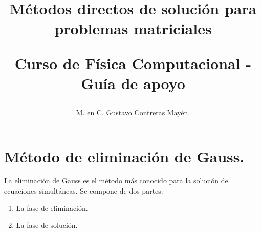 

\title{Métodos directos de solución para problemas matriciales \\ \begin{Large}Curso de Física Computacional - Guía de apoyo \end{Large}}
\author{M. en C. Gustavo Contreras Mayén.}
%

\fontsize{14}{14}\selectfont
\maketitle
\section{Método de eliminación de Gauss.}
La eliminación de Gauss es el método más conocido para la solución de ecuaciones simultáneas. Se compone de dos partes:
\begin{enumerate}
\item La fase de eliminación.
\item La fase de solución.
\end{enumerate}
